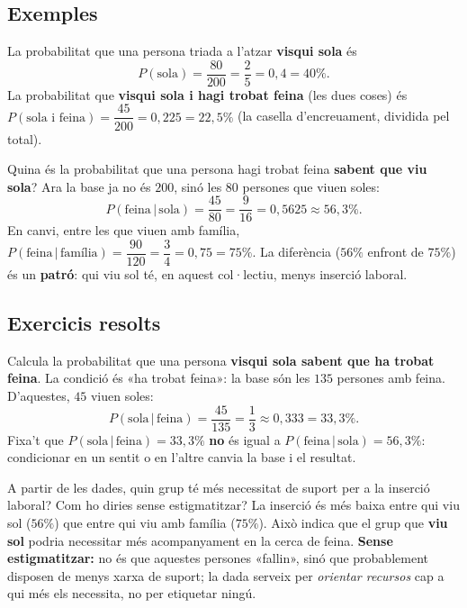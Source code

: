 \subsection{Exemples}

\begin{exemple}
La probabilitat que una persona triada a l'atzar \textbf{visqui sola} és
\[
P(\text{sola})=\frac{80}{200}=\frac{2}{5}=0,4=40\%.
\]
La probabilitat que \textbf{visqui sola i hagi trobat feina} (les dues coses) és
$P(\text{sola i feina})=\dfrac{45}{200}=0,225=22,5\%$ (la casella d'encreuament, dividida
pel total).
\end{exemple}

\begin{exemple}
Quina és la probabilitat que una persona hagi trobat feina \textbf{sabent que viu sola}?
Ara la base ja no és $200$, sinó les $80$ persones que viuen soles:
\[
P(\text{feina}\,|\,\text{sola})=\frac{45}{80}=\frac{9}{16}=0,5625\approx 56,3\%.
\]
En canvi, entre les que viuen amb família,
$P(\text{feina}\,|\,\text{família})=\dfrac{90}{120}=\dfrac{3}{4}=0,75=75\%$. La
diferència ($56\%$ enfront de $75\%$) és un \textbf{patró}: qui viu sol té, en aquest
col·lectiu, menys inserció laboral.
\end{exemple}

\subsection{Exercicis resolts}

\begin{exresolt}
Calcula la probabilitat que una persona \textbf{visqui sola sabent que ha trobat feina}.
\solucio
La condició és «ha trobat feina»: la base són les $135$ persones amb feina. D'aquestes,
$45$ viuen soles:
\[
P(\text{sola}\,|\,\text{feina})=\frac{45}{135}=\frac{1}{3}\approx 0,333=33,3\%.
\]
Fixa't que $P(\text{sola}\,|\,\text{feina})=33,3\%$ \textbf{no} és igual a
$P(\text{feina}\,|\,\text{sola})=56,3\%$: condicionar en un sentit o en l'altre canvia la
base i el resultat.
\end{exresolt}

\begin{exresolt}
A partir de les dades, quin grup té més necessitat de suport per a la inserció laboral?
Com ho diries sense estigmatitzar?
\solucio
La inserció és més baixa entre qui viu sol ($56\%$) que entre qui viu amb família
($75\%$). Això indica que el grup que \textbf{viu sol} podria necessitar més
acompanyament en la cerca de feina. \textbf{Sense estigmatitzar:} no és que aquestes
persones «fallin», sinó que probablement disposen de menys xarxa de suport; la dada
serveix per \emph{orientar recursos} cap a qui més els necessita, no per etiquetar
ningú.
\end{exresolt}

